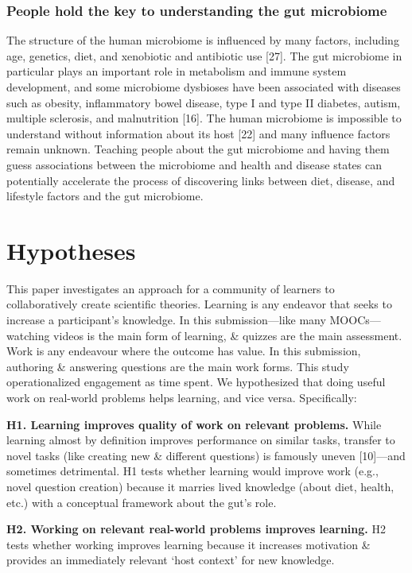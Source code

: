 \subsubsection{People hold the key to understanding the gut microbiome}
The structure of the human microbiome is influenced by many factors, including age, genetics, diet, and xenobiotic and antibiotic use [27]. The gut microbiome in particular plays an important role in metabolism and immune system development, and some microbiome dysbioses have been associated with diseases such as obesity, inflammatory bowel disease, type I and type II diabetes, autism, multiple sclerosis, and malnutrition [16]. The human microbiome is impossible to understand without information about its host [22] and many influence factors remain unknown. Teaching people about the gut microbiome and having them guess associations between the microbiome and health and disease states can potentially accelerate the process of discovering links between diet, disease, and lifestyle factors and the gut microbiome.

\section{Hypotheses}
This paper investigates an approach for a community of learners to collaboratively create scientific theories. Learning is any endeavor that seeks to increase a participant’s knowledge. In this submission—like many MOOCs—watching videos is the main form of learning, \& quizzes are the main assessment. Work is any endeavour where the outcome has value. In this submission, authoring \& answering questions are the main work forms. This study operationalized engagement as time spent. We hypothesized that doing useful work on real-world problems helps learning, and vice versa. Specifically:

\textbf{H1. Learning improves quality of work on relevant problems.}
While learning almost by definition improves performance on similar tasks, transfer to novel tasks (like creating new \& different questions) is famously uneven [10]—and sometimes detrimental. H1 tests whether learning would improve work (e.g., novel question creation) because it marries lived knowledge (about diet, health, etc.) with a conceptual framework about the gut’s role.

\textbf{H2. Working on relevant real-world problems improves learning.}
H2 tests whether working improves learning because it increases motivation \& provides an immediately relevant ‘host context’ for new knowledge.
 
